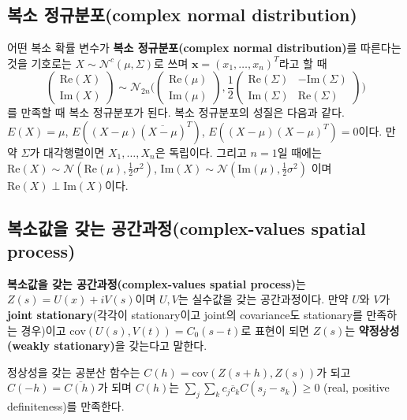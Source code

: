 \documentclass[b5paper,]{scrbook}
\theoremstyle{plain}
\theoremstyle{definition}
\numberwithin{equation}{section}
\begin{document}
\hypertarget{-complex-normal-distribution}{%
\subsection{복소 정규분포(complex normal distribution)}\label{-complex-normal-distribution}}

어떤 복소 확률 변수가 \textbf{복소 정규분포(complex normal distribution)}를 따른다는 것을 기호로는 \(X\sim \mathcal{N}^{c}(\mu,\Sigma)\)로 쓰며 \(\mathbf{x}=(x_{1},\ldots, x_{n})^{T}\)라고 할 때
\[
\begin{pmatrix}
\text{Re}(X) \\
\text{Im}(X)
\end{pmatrix}
\sim
\mathcal{N}_{2n}
\Bigg(
\begin{pmatrix}
\text{Re}(\mu) \\
\text{Im}(\mu)
\end{pmatrix},
\frac{1}{2}
\begin{pmatrix}
\text{Re}(\Sigma) & -\text{Im}(\Sigma) \\
\text{Im}(\Sigma) & \text{Re}(\Sigma)
\end{pmatrix}
\Bigg)
\]
를 만족할 때 복소 정규분포가 된다. 복소 정규분포의 성질은 다음과 같다. \(E(X)=\mu\), \(E((X-\mu)(\overline{X-\mu})^{T})\), \(E((X-\mu)(X-\mu)^{T})=0\)이다. 만약 \(\Sigma\)가 대각행렬이면 \(X_{1},\ldots , X_{n}\)은 독립이다. 그리고 \(n=1\)일 때에는 \(\text{Re}(X)\sim \mathcal{N}(\text{Re}(\mu), \frac{1}{2}\sigma^{2})\), \(\text{Im}(X)\sim \mathcal{N}(\text{Im}(\mu), \frac{1}{2}\sigma^{2})\) 이며 \(\text{Re}(X) \perp \text{Im}(X)\)이다.

\hypertarget{--complex-values-spatial-process}{%
\subsection{복소값을 갖는 공간과정(complex-values spatial process)}\label{--complex-values-spatial-process}}

\textbf{복소값을 갖는 공간과정(complex-values spatial process)}는 \(Z(s)=U(x)+iV(s)\)이며 \(U,V\)는 실수값을 갖는 공간과정이다. 만약 \(U\)와 \(V\)가 \textbf{joint stationary}(각각이 stationary이고 joint의 covariance도 stationary를 만족하는 경우)이고 \(\text{cov}(U(s),V(t))=C_{0}(s-t)\)로 표현이 되면 \(Z(s)\)는 \textbf{약정상성(weakly stationary)}을 갖는다고 말한다.

정상성을 갖는 공분산 함수는 \(C(h)=\text{cov}(Z(s+h),Z(s))\)가 되고 \(C(-h)=\overline{C(h)}\)가 되며 \(C(h)\)는 \(\sum_{j}\sum_{k}c_{j}\overline{c}_{k}C(s_{j}-s_{k})\geq 0\) (real, positive definiteness)를 만족한다.
\end{document}
